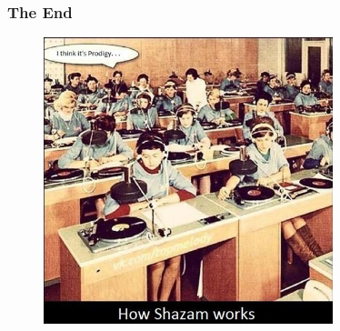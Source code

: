 \documentclass{beamer}
\begin{document}
\begin{frame}
    \frametitle{The End}
    \begin{figure}
        \centering
        \includegraphics[width=0.75\textwidth]{end.jpeg}
    \end{figure}
\end{frame}
\end{document}
